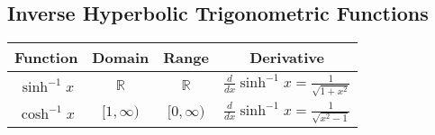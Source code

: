 \documentclass[../ma2002_notes.tex]{subfiles}
\begin{document}
\subsection{Inverse Hyperbolic Trigonometric Functions}
\begin{center}
\begin{tabular}{|c|c|c|c|}
\hline
Function & Domain & Range & Derivative\\
\hline
\(\sinh^{-1}x\) & \(\mathbb{R}\) & \(\mathbb{R}\) & \(\displaystyle\frac{d}{dx}\sinh^{-1}x=\frac{1}{\sqrt{1+x^2}}\)\\[10pt]
\hline
\(\cosh^{-1}x\) & \([1,\infty)\) & \([0,\infty)\) & \(\displaystyle\frac{d}{dx}\sinh^{-1}x=\frac{1}{\sqrt{x^2-1}}\)\\[10pt]
\hline
\end{tabular}
\end{center}
\end{document}
